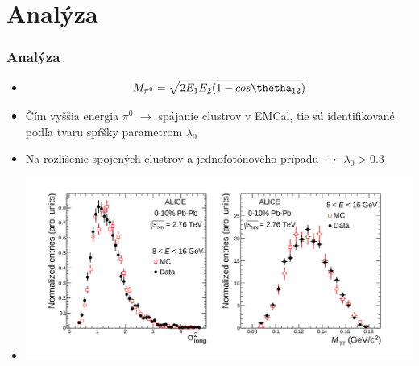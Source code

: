 \documentclass{beamer}
\begin{document}
	\section{Analýza}
	\begin{frame}
		\frametitle{Analýza}
		\begin{itemize}
			\item[] \begin{equation}
			         \centering M_{\pi^0}=\sqrt{2E_1E_2(1-cos\thetha_{12})} 
			        \end{equation}

			\item Čím vyššia energia $\pi^{0}$ $\rightarrow$ spájanie clustrov v EMCal, tie sú identifikované podľa tvaru spŕšky parametrom $\lambda_{0}$
			\item Na rozlíšenie spojených clustrov a jednofotónového prípadu $\rightarrow$ $\lambda_{0}>0.3$
			\item[] \centering \includegraphics[scale=0.18]{./Obrazky/lambda0.png}
		\end{itemize}
	\end{frame}
	
\end{document}
